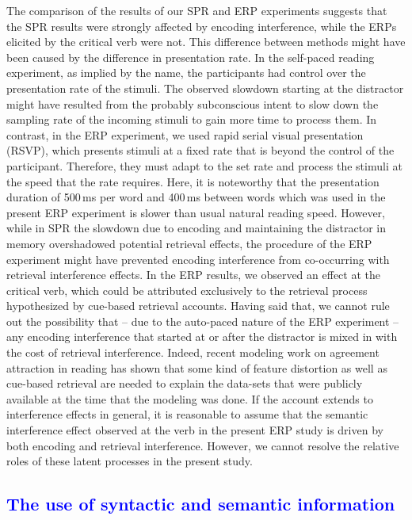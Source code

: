 \documentclass[review,preprint,12pt,authoryear,floatsintext]{elsarticle}
\begin{document}
{{The comparison of the results of our SPR and ERP experiments suggests that the SPR results were strongly affected by encoding interference, while the ERPs elicited by the critical verb were not. This difference between methods might have been caused by the difference in presentation rate. In the self-paced reading experiment, as implied by the name, the participants had control over the presentation rate of the stimuli. The observed slowdown starting at the distractor  might have resulted from the probably subconscious intent to slow down the sampling rate of the incoming stimuli to gain more time to process them. In contrast, in the ERP experiment, we used rapid serial visual presentation (RSVP), which presents stimuli at a fixed rate that is beyond the control of the participant. Therefore, they must adapt to the set rate and process the stimuli at the speed that the rate requires. Here, it is noteworthy that the presentation duration of 500\,ms per word and 400\,ms between words which was used in the present ERP experiment is slower than usual natural reading speed. However, while in SPR the slowdown due to encoding and maintaining the distractor in memory overshadowed potential retrieval effects, the procedure of the ERP experiment might have prevented encoding interference from co-occurring with retrieval interference effects. In the ERP results, we observed an effect at the critical verb, which could be attributed exclusively to the retrieval process hypothesized by cue-based retrieval accounts. Having said that, we cannot rule out the possibility that -- due to the auto-paced nature of the ERP experiment -- any encoding interference that started at or after the distractor is mixed in with the cost of retrieval interference. Indeed, recent modeling work on agreement attraction in reading \citep{Yadavetal2022} has shown that some kind of feature distortion as well as cue-based retrieval are needed to explain the data-sets that were publicly available at the time that the modeling was done. If the \cite{Yadavetal2022} account extends to interference effects in general, 
it is reasonable to assume that the semantic interference effect observed at the verb in the present ERP study is driven by both encoding and retrieval interference. However, we cannot resolve the relative roles of these latent processes in the present study.


\subsection*{\textcolor{blue}{The use of syntactic and semantic information}}

}}
\end{document}
